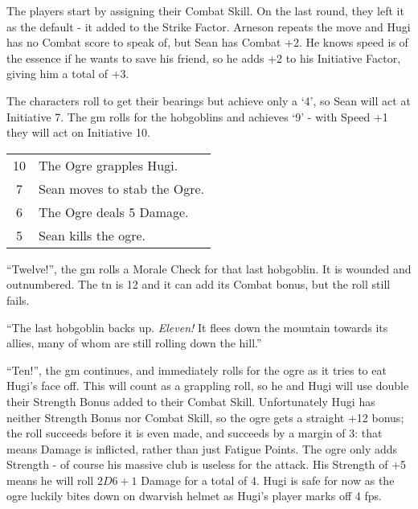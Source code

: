 \begin{exampletext}


The players start by assigning their Combat Skill.
On the last \gls{round}, they left it as the default - it added to the Strike Factor.
Arneson repeats the move and Hugi has no Combat score to speak of, but Sean has Combat +2.
He knows speed is of the essence if he wants to save his friend, so he adds +2 to his Initiative Factor, giving him a total of +3.

The characters roll to get their bearings but achieve only a `4', so Sean will act at Initiative 7.
The \gls{gm} rolls for the hobgoblins and achieves `9' - with Speed +1 they will act on Initiative 10.

\vspace{1em}

\begin{tabularx}{.3\textwidth}{c|X}
\setcounter{enc}{12}

10 & The Ogre grapples Hugi. \\

7 & Sean moves to stab the Ogre. \\

6 & The Ogre deals 5 Damage. \\

5 & Sean kills the ogre. \\

\end{tabularx}

\vspace{1em}

``Twelve!'', the \gls{gm} rolls a Morale Check for that last hobgoblin. It is wounded and outnumbered. The \gls{tn} is 12 and it can add its Combat bonus, but the roll still fails.

``The last hobgoblin backs up. \textit{Eleven!} It flees down the mountain towards its allies, many of whom are still rolling down the hill.''

``Ten!'', the \gls{gm} continues, and immediately rolls for the ogre as it tries to eat Hugi's face off.
This will count as a grappling roll, so he and Hugi will use double their Strength Bonus added to their Combat Skill.
Unfortunately Hugi has neither Strength Bonus nor Combat Skill, so the ogre gets a straight +12 bonus; the roll succeeds before it is even made, and succeeds by a margin of 3: that means Damage is inflicted, rather than just Fatigue Points.
The ogre only adds Strength - of course his massive club is useless for the attack.
His Strength of +5 means he will roll $2D6+1$ Damage for a total of 4. Hugi is safe for now as the ogre luckily bites down on dwarvish helmet as Hugi's player marks off 4 \glspl{fp}.


\end{exampletext}
